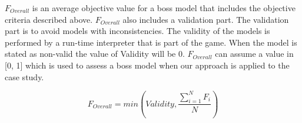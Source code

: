 $F_{Overall}$ is an average objective value for a boss model that includes the objective criteria described above. $F_{Overall}$ also includes a validation part. The validation part is to avoid models with inconsistencies. The validity of the models is performed by a run-time interpreter that is part of the game. When the model is stated as non-valid the value of Validity will be 0. $F_{Overall}$ can assume a value in [0, 1] which is used to assess a boss model when our \ApproachName{} approach is applied to the \CaseStudy{} case study.

\begin{equation}
F_{Overall} = min( Validity, \frac{\sum\limits_{i=1}^{N}F_{i}}{N} )
\end{equation}






